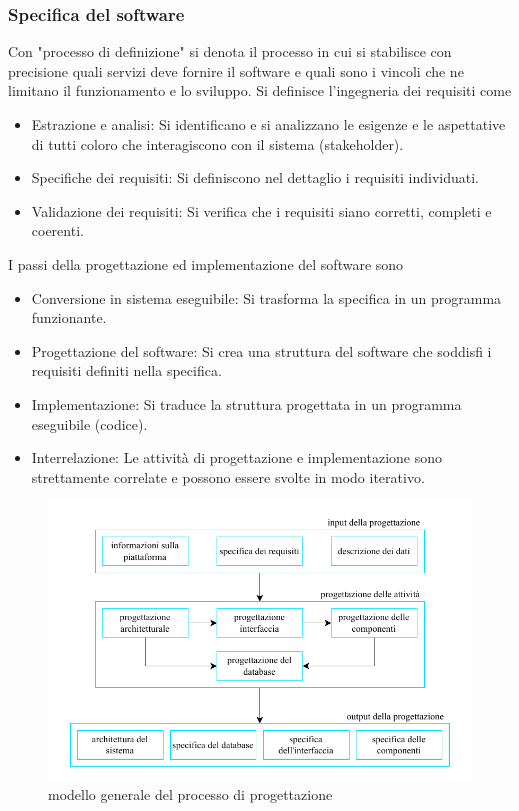 \documentclass[10pt, letterpaper]{report}
\begin{document}
\subsubsection{Specifica del software}
Con  "processo di definizione" si denota il processo in cui si stabilisce con precisione quali servizi deve fornire il software e quali sono i vincoli che ne limitano il funzionamento e lo sviluppo. Si definisce l'ingegneria dei requisiti come\begin{itemize}
    \item Estrazione e analisi: Si identificano e si analizzano le esigenze e le aspettative di tutti coloro che interagiscono con il sistema (stakeholder).
    \item Specifiche dei requisiti: Si definiscono nel dettaglio i requisiti individuati.
    \item Validazione dei requisiti: Si verifica che i requisiti siano corretti, completi e coerenti.
\end{itemize}
I passi della progettazione ed implementazione del software sono\begin{itemize}
    \item Conversione in sistema eseguibile: Si trasforma la specifica in un programma funzionante.
    \item Progettazione del software: Si crea una struttura del software che soddisfi i requisiti definiti nella specifica.
    \item Implementazione: Si traduce la struttura progettata in un programma eseguibile (codice).
    \item Interrelazione: Le attività di progettazione e implementazione sono strettamente correlate e possono essere svolte in modo iterativo.
\end{itemize}
\begin{center}
    \begin{figure}[h!]
        \centering 
        \includegraphics[width=1\textwidth ]{images/generalModelDesProc.pdf}
        \caption{modello generale del processo di progettazione}
    \end{figure}\end{center}
\end{document}
